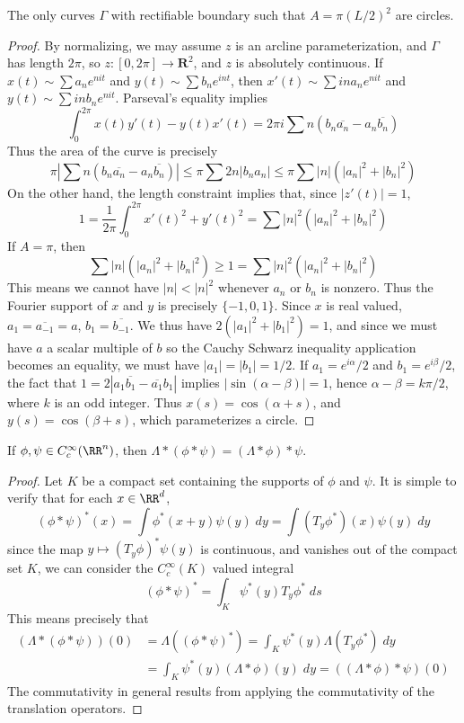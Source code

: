 \begin{theorem}
  The only curves $\Gamma$ with rectifiable boundary such that $A = \pi (L/2)^2$ are circles.
\end{theorem}
\begin{proof}
By normalizing, we may assume $z$ is an arcline parameterization, and $\Gamma$ has length $2\pi$, so $z:[0,2\pi] \to \mathbf{R}^2$, and $z$ is absolutely continuous. If $x(t) \sim \sum a_n e^{nit}$ and $y(t) \sim \sum b_n e^{int}$, then $x'(t) \sim \sum i n a_n e^{n i t}$ and $y(t) \sim \sum i n b_n e^{nit}$. Parseval's equality implies
%
\[ \int_0^{2\pi} x(t) y'(t) - y(t) x'(t) = 2 \pi i \sum n (b_n \overline{a_n} - a_n \overline{b_n}) \]
%
Thus the area of the curve is precisely
%
\[ \pi \left| \sum n (b_n \overline{a_n} - a_n \overline{b_n}) \right| \leq \pi \sum 2n|b_na_n| \leq \pi \sum |n|(|a_n|^2 + |b_n|^2) \]
%
On the other hand, the length constraint implies that, since $|z'(t)| = 1$,
%
\[ 1 = \frac{1}{2\pi} \int_0^{2\pi} x'(t)^2 + y'(t)^2 = \sum |n|^2(|a_n|^2 + |b_n|^2) \]
%
If $A = \pi$, then
%
\[ \sum |n| (|a_n|^2 + |b_n|^2) \geq 1 = \sum |n|^2 (|a_n|^2 + |b_n|^2) \]
%
This means we cannot have $|n| < |n|^2$ whenever $a_n$ or $b_n$ is nonzero. Thus the Fourier support of $x$ and $y$ is precisely $\{ -1, 0, 1 \}$. Since $x$ is real valued, $a_1 = \overline{a_{-1}} = a$, $b_1 = \overline{b_{-1}}$. We thus have $2(|a_1|^2 + |b_1|^2) = 1$, and since we must have $a$ a scalar multiple of $b$ so the Cauchy Schwarz inequality application becomes an equality, we must have $|a_1| = |b_1| = 1/2$. If $a_1 = e^{i\alpha}/2$ and $b_1 = e^{i\beta}/2$, the fact that $1 = 2|a_1\overline{b_1} - \overline{a_1}b_1|$ implies $|\sin(\alpha - \beta)| = 1$, hence $\alpha - \beta = k \pi /2$, where $k$ is an odd integer. Thus $x(s) = \cos(\alpha + s)$, and $y(s) = \cos(\beta + s)$, which parameterizes a circle.
\end{proof}





\begin{theorem}
    If $\phi, \psi \in C_c^\infty(\RR^n)$, then $\Lambda * (\phi * \psi) = (\Lambda * \phi) * \psi$.
\end{theorem}
\begin{proof}
  Let $K$ be a compact set containing the supports of $\phi$ and $\psi$. It is simple to verify that for each $x \in \RR^d$,
    \[ (\phi * \psi)^*(x) = \int \phi^*(x + y) \psi(y)\; dy = \int (T_y \phi^*)(x) \psi(y)\; dy \]
    since the map $y \mapsto (T_y \phi)^* \psi(y)$ is continuous, and vanishes out of the compact set $K$, we can consider the $C_c^\infty(K)$ valued integral
    \[ (\phi * \psi)^* = \int_K \psi^*(y) T_y \phi^*\; ds \]
    This means precisely that
    \begin{align*}
        (\Lambda * (\phi * \psi))(0) &= \Lambda((\phi * \psi)^*) = \int_K \psi^*(y) \Lambda(T_y \phi^*)\; dy\\
        &= \int_K \psi^*(y) (\Lambda * \phi)(y)\; dy = ((\Lambda * \phi) * \psi)(0)
    \end{align*}
    The commutativity in general results from applying the commutativity of the translation operators.
\end{proof}

